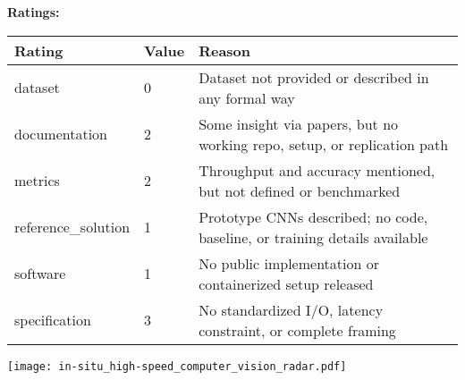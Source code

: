 {{{\bf Ratings:} ~ \\

\begin{tabular}{p{} p{} p{}}
\hline
Rating & Value & Reason \\
\hline
dataset & 0 & Dataset not provided or described in any formal way
 \\
documentation & 2 & Some insight via papers, but no working repo, setup, or replication path
 \\
metrics & 2 & Throughput and accuracy mentioned, but not defined or benchmarked
 \\
reference\_solution & 1 & Prototype CNNs described; no code, baseline, or training details available
 \\
software & 1 & No public implementation or containerized setup released
 \\
specification & 3 & No standardized I/O, latency constraint, or complete framing
 \\
\hline
\end{tabular}

\texttt{[image: in-situ\_high-speed\_computer\_vision\_radar.pdf]}
}}
\clearpage